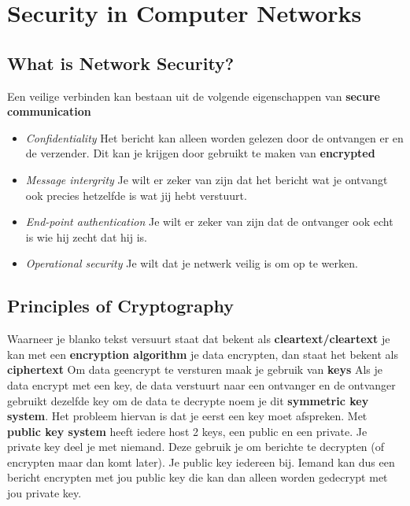 \addtocounter{section}{1}
\section{Security in Computer Networks}
\subsection{What is Network Security?}
Een veilige verbinden kan bestaan uit de volgende eigenschappen van \textbf{secure communication}
\begin{itemize}
    \item \textit{Confidentiality} Het bericht kan alleen worden gelezen door de ontvangen er en de verzender. Dit kan je krijgen door gebruikt te maken van \textbf{encrypted}
    \item \textit{Message intergrity} Je wilt er zeker van zijn dat het bericht wat je ontvangt ook precies hetzelfde is wat jij hebt verstuurt.
    \item \textit{End-point authentication} Je wilt er zeker van zijn dat de ontvanger ook echt is wie hij zecht dat hij is.
    \item \textit{Operational security} Je wilt dat je netwerk veilig is om op te werken.
\end{itemize}
\subsection{Principles of Cryptography}
Waarneer je blanko tekst versuurt staat dat bekent als \textbf{cleartext/cleartext} je kan met een \textbf{encryption algorithm} je data encrypten, dan staat het bekent als \textbf{ciphertext}
\newline
Om data geencrypt te versturen maak je gebruik van \textbf{keys} Als je data encrypt met een key, de data verstuurt naar een ontvanger en de ontvanger gebruikt dezelfde key om de data te decrypte noem je dit \textbf{symmetric key system}. Het probleem hiervan is dat je eerst een key moet afspreken.
\newline
Met \textbf{public key system} heeft iedere host 2 keys, een public en een private. Je private key deel je met
niemand. Deze gebruik je om berichte te decrypten (of encrypten maar dan komt later). Je public key iedereen bij.
Iemand kan dus een bericht encrypten met jou public key die kan dan alleen worden gedecrypt met jou private key.

